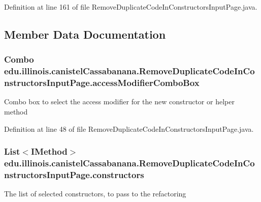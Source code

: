 Definition at line 161 of file RemoveDuplicateCodeInConstructorsInputPage.java.



\subsection{Member Data Documentation}
\hypertarget{classedu_1_1illinois_1_1canistelCassabanana_1_1RemoveDuplicateCodeInConstructorsInputPage_ad900b2c0bfbdbac5a701b3e5834f1962}{
\subsubsection[{accessModifierComboBox}]{\setlength{\rightskip}{0pt plus 5cm}Combo {\bf edu.illinois.canistelCassabanana.RemoveDuplicateCodeInConstructorsInputPage.accessModifierComboBox}}}
\label{classedu_1_1illinois_1_1canistelCassabanana_1_1RemoveDuplicateCodeInConstructorsInputPage_ad900b2c0bfbdbac5a701b3e5834f1962}
Combo box to select the access modifier for the new constructor or helper method 

Definition at line 48 of file RemoveDuplicateCodeInConstructorsInputPage.java.

\hypertarget{classedu_1_1illinois_1_1canistelCassabanana_1_1RemoveDuplicateCodeInConstructorsInputPage_acdcd523154c691ec0083de31b628b54d}{
\subsubsection[{constructors}]{\setlength{\rightskip}{0pt plus 5cm}List$<$IMethod$>$ {\bf edu.illinois.canistelCassabanana.RemoveDuplicateCodeInConstructorsInputPage.constructors}}}
\label{classedu_1_1illinois_1_1canistelCassabanana_1_1RemoveDuplicateCodeInConstructorsInputPage_acdcd523154c691ec0083de31b628b54d}
The list of selected constructors, to pass to the refactoring 

